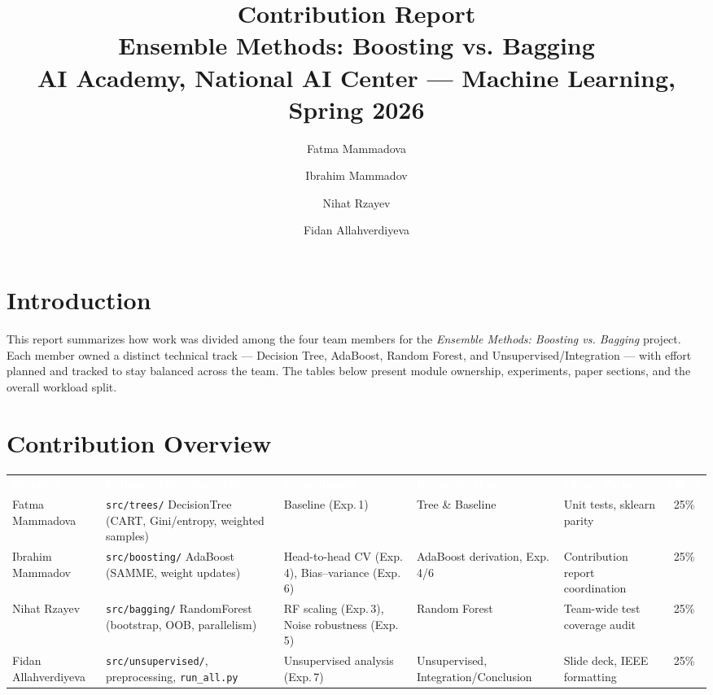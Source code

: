 \documentclass{article}
\title{\color{headerblue}\textbf{Contribution Report}\\[4pt]
\large\normalfont Ensemble Methods: Boosting vs. Bagging\\
\large\normalfont AI Academy, National AI Center --- Machine Learning, Spring 2026}
\author{Fatma Mammadova \and Ibrahim Mammadov \and Nihat Rzayev \and Fidan Allahverdiyeva}
\date{}
\begin{document}
\maketitle
\thispagestyle{fancy}

\section*{Introduction}
This report summarizes how work was divided among the four team members for the
\emph{Ensemble Methods: Boosting vs. Bagging} project. Each member owned a distinct
technical track --- Decision Tree, AdaBoost, Random Forest, and Unsupervised/Integration ---
with effort planned and tracked to stay balanced across the team. The tables below present
module ownership, experiments, paper sections, and the overall workload split.

\section{Contribution Overview}
{
\begin{table}[h]
\centering
\small
\begin{tabular}{L{2.1cm} L{3.1cm} L{2.7cm} L{2.3cm} L{2.7cm} c}
\textcolor{white}{\textbf{Member}} & \textcolor{white}{\textbf{Primary Modules / Files}} & \textcolor{white}{\textbf{Experiments}} & \textcolor{white}{\textbf{Paper Sections}} & \textcolor{white}{\textbf{Other Tasks}} & \textcolor{white}{\textbf{Effort}} \\
Fatma Mammadova &
\texttt{src/trees/} DecisionTree (CART, Gini/entropy, weighted samples) &
Baseline (Exp.\,1) &
Tree \& Baseline &
Unit tests, sklearn parity &
25\% \\
Ibrahim Mammadov &
\texttt{src/boosting/} AdaBoost (SAMME, weight updates) &
Head-to-head CV (Exp.\,4), Bias--variance (Exp.\,6) &
AdaBoost derivation, Exp.\,4/6 &
Contribution report coordination &
25\% \\
Nihat Rzayev &
\texttt{src/bagging/} RandomForest (bootstrap, OOB, parallelism) &
RF scaling (Exp.\,3), Noise robustness (Exp.\,5) &
Random Forest &
Team-wide test coverage audit &
25\% \\
Fidan Allahverdiyeva &
\texttt{src/unsupervised/}, preprocessing, \texttt{run\_all.py} &
Unsupervised analysis (Exp.\,7) &
Unsupervised, Integration/Conclusion &
Slide deck, IEEE formatting &
25\% \\
\end{tabular}
\end{table}}
\end{document}
